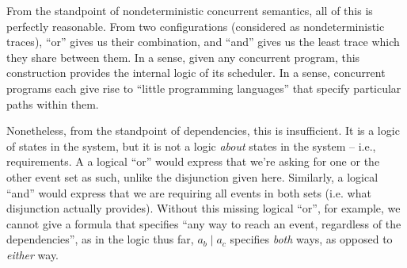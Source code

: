 \documentclass[hoptionsi,review,screen,format=acmsmall]{acmart}
\theoremstyle{definition}
\newcommand{\bor}{\mathop{|}}
\begin{document}


From the standpoint of nondeterministic concurrent semantics, all of this is perfectly reasonable. From two configurations (considered as nondeterministic traces), ``or'' gives us their combination, and ``and'' gives us the least trace which they share between them. In a sense, given any concurrent program, this construction provides the internal logic of its scheduler. In a sense, concurrent programs each give rise to ``little programming languages'' that specify particular paths within them.

Nonetheless, from the standpoint of dependencies, this is insufficient. It is a logic of states in the system, but it is not a logic \textit{about} states in the system -- i.e., requirements. A a logical ``or''  would express that we're asking for one or the other event set as such, unlike the disjunction given here. Similarly, a logical ``and'' would express that we are requiring all events in both sets (i.e. what disjunction actually provides). Without this missing logical ``or'', for example, we cannot give a formula that specifies ``any way to reach an event, regardless of the dependencies'', as in the logic thus far, \(a_b \bor a_c\) specifies \textit{both} ways, as opposed to \textit{either} way.
\end{document}
